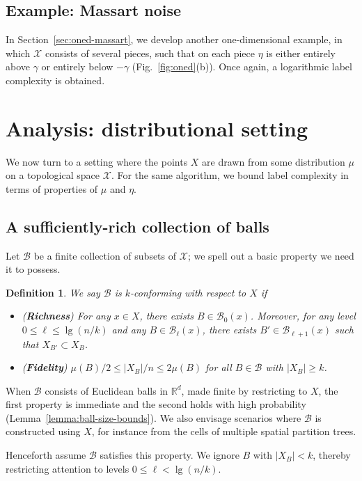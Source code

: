 \documentclass[twoside]{article}
\def\R{{\mathbb{R}}}
\def\X{{\mathcal X}}
\def\B{{\mathcal B}}
\newtheorem{defn}[thm]{Definition}
\begin{document}
\subsection{Example: Massart noise}

In Section~\ref{sec:oned-massart}, we develop another one-dimensional example, in which $\X$ consists of several pieces, such that on each piece $\eta$ is either entirely above $\gamma$ or entirely below $-\gamma$ (Fig.~\ref{fig:oned}(b)). Once again, a logarithmic label complexity is obtained.


\section{Analysis: distributional setting}
\label{sec:continuous}

We now turn to a setting where the points $X$ are drawn from some distribution $\mu$ on a topological space $\X$. For the same algorithm, we bound label complexity in terms of properties of $\mu$ and $\eta$. 

\subsection{A sufficiently-rich collection of balls}

Let $\B$ be a finite collection of subsets of $\X$; we spell out a basic property we need it to possess.

\begin{defn}
We say $\B$ is \emph{$k$-conforming} with respect to $X$ if 
\begin{itemize}
\item ({\bf Richness}) For any $x \in X$, there exists $B \in \B_0(x)$. Moreover, for any level $0 \leq \ell \leq \lg (n/k)$ and any $B \in \B_\ell(x)$, there exists $B' \in \B_{\ell+1}(x)$ such that $X_{B'} \subset X_B$.
\item ({\bf Fidelity}) $\mu(B)/2 \leq |X_B|/n \leq 2\mu(B)$ for all $B \in \B$ with $|X_B| \geq k$.
\end{itemize}
\label{defn:conformity}
\end{defn}
When $\B$ consists of Euclidean balls in $\R^d$, made finite by restricting to $X$, the first property is immediate and the second holds with high probability (Lemma~\ref{lemma:ball-size-bounds}). We also envisage scenarios where $\B$ is constructed using $X$, for instance from the cells of multiple spatial partition trees.

Henceforth assume $\B$ satisfies this property.  We ignore $B$ with $|X_B| < k$, thereby restricting attention to levels $0 \leq \ell < \lg (n/k)$.
\end{document}
